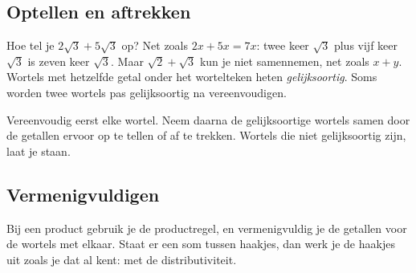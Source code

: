 \subsection{Optellen en aftrekken}

Hoe tel je $2\sqrt3 + 5\sqrt3$ op? Net zoals $2x + 5x = 7x$: twee keer $\sqrt3$ plus vijf keer $\sqrt3$ is zeven keer $\sqrt3$. Maar $\sqrt2 + \sqrt3$ kun je niet samennemen, net zoals $x + y$. Wortels met hetzelfde getal onder het wortelteken heten \textit{gelijksoortig}. Soms worden twee wortels pas gelijksoortig na vereenvoudigen.


\begin{werkwijze}
Vereenvoudig eerst elke wortel. Neem daarna de gelijksoortige wortels samen door de getallen ervoor op te tellen of af te trekken. Wortels die niet gelijksoortig zijn, laat je staan.
\end{werkwijze}

\begin{oefeningen}
\end{oefeningen}

\subsection{Vermenigvuldigen}

Bij een product gebruik je de productregel, en vermenigvuldig je de getallen voor de wortels met elkaar. Staat er een som tussen haakjes, dan werk je de haakjes uit zoals je dat al kent: met de distributiviteit.


